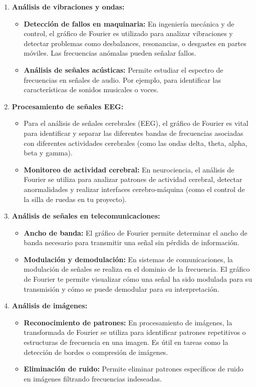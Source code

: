 \documentclass{article}
\begin{document}
\begin{enumerate}
    \item \textbf{Análisis de vibraciones y ondas:}
    \begin{itemize}
        \item \textbf{Detección de fallos en maquinaria:} En ingeniería mecánica y de control, el gráfico de Fourier es utilizado para analizar vibraciones y detectar problemas como desbalances, resonancias, o desgastes en partes móviles. Las frecuencias anómalas pueden señalar fallos.
    
        \item \textbf{Análisis de señales acústicas:} Permite estudiar el espectro de frecuencias en señales de audio. Por ejemplo, para identificar las características de sonidos musicales o voces.
    \end {itemize}
    
    \item \textbf{Procesamiento de señales EEG:}
    \begin{itemize}
        \item Para el análisis de señales cerebrales (EEG), el gráfico de Fourier es vital para identificar y separar las diferentes bandas de frecuencias asociadas con diferentes actividades cerebrales (como las ondas delta, theta, alpha, beta y gamma).
    
        \item \textbf{Monitoreo de actividad cerebral:} En neurociencia, el análisis de Fourier se utiliza para analizar patrones de actividad cerebral, detectar anormalidades y realizar interfaces cerebro-máquina (como el control de la silla de ruedas en tu proyecto).
    \end{itemize}
    \item \textbf{Análisis de señales en telecomunicaciones:}
    \begin{itemize}
        \item \textbf{Ancho de banda:} El gráfico de Fourier permite determinar el ancho de banda necesario para transmitir una señal sin pérdida de información.
    
        \item \textbf{Modulación y demodulación:} En sistemas de comunicaciones, la modulación de señales se realiza en el dominio de la frecuencia. El gráfico de Fourier te permite visualizar cómo una señal ha sido modulada para su transmisión y cómo se puede demodular para su interpretación.
    \end{itemize}
    \item \textbf{Análisis de imágenes:}
    \begin{itemize}
        \item \textbf{Reconocimiento de patrones:} En procesamiento de imágenes, la transformada de Fourier se utiliza para identificar patrones repetitivos o estructuras de frecuencia en una imagen. Es útil en tareas como la detección de bordes o compresión de imágenes.
    
        \item \textbf{Eliminación de ruido:} Permite eliminar patrones específicos de ruido en imágenes filtrando frecuencias indeseadas.
    \end{itemize}
\end{enumerate}
\end{document}
